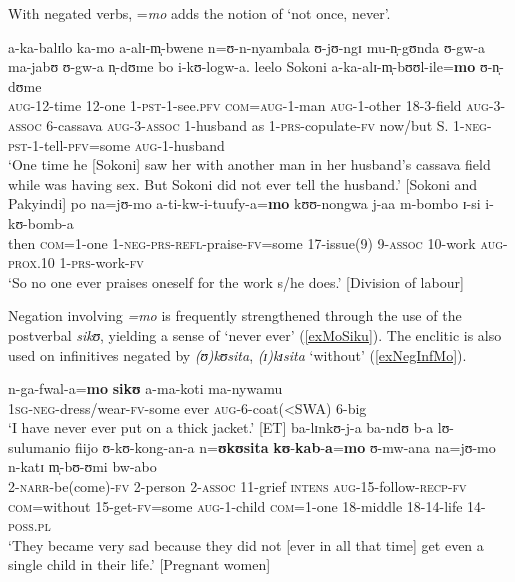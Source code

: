 With negated verbs, =\textit{mo} adds the notion of `not once, never'.
\begin{exe}
	\ex \gll a-ka-balɪlo ka-mo a-alɪ-m̩-bwene n=ʊ-n-nyambala ʊ-jʊ-ngɪ mu-n̩-gʊnda ʊ-gw-a ma-jabʊ ʊ-gw-a n̩-dʊme bo i-kʊ-logw-a. leelo Sokoni a-ka-alɪ-m̩-bʊʊl-ile=\textbf{mo} ʊ-n̩-dʊme\\
	\textsc{aug}-12-time 12-one 1-\textsc{pst}-1-see.\textsc{pfv} \textsc{com}=\textsc{aug}-1-man \textsc{aug}-1-other 18-3-field \textsc{aug}-3-\textsc{assoc} 6-cassava \textsc{aug}-3-\textsc{assoc} 1-husband as 1-\textsc{prs}-copulate-\textsc{fv} now/but S. 1-\textsc{neg}-\textsc{pst}-1-tell-\textsc{pfv}=some \textsc{aug}-1-husband\\
	\glt `‎‎One time he [Sokoni] saw her with another man in her husband's cassava field while was having sex. But Sokoni did not ever tell the husband.' [Sokoni and Pakyindi]
	\ex \gll po na=jʊ-mo a-ti-kw-i-tuufy-a=\textbf{mo} kʊʊ-nongwa j-aa m-bombo ɪ-si i-kʊ-bomb-a\\
	then \textsc{com}=1-one 1-\textsc{neg}-\textsc{prs}-\textsc{refl}-praise-\textsc{fv}=some 17-issue(9) 9-\textsc{assoc} 10-work \textsc{aug}-\textsc{prox.10} 1-\textsc{prs}-work-\textsc{fv}\\
	\glt \lq So no one ever praises oneself for the work s/he does.' [Division of labour]
\end{exe}

Negation involving \textit{=mo} is frequently strengthened through the use of the postverbal \textit{sikʊ}, yielding a sense of `never ever' (\ref{exMoSiku}). The enclitic is also used on infinitives negated by \textit{(ʊ)kʊsita}, \textit{(ɪ)kɪsita} `without' (\ref{exNegInfMo}).
\begin{exe}
	\ex\label{exMoSiku}
	\gll n-ga-fwal-a=\textbf{mo} \textbf{sikʊ} a-ma-koti ma-nywamu\\
	\textsc{1sg}-\textsc{neg}-dress/wear-\textsc{fv}-some ever \textsc{aug}-6-coat(<SWA) 6-big\\
	\glt \lq I have never ever put on a thick jacket.' [ET]
	\ex \label{exNegInfMo}
	\gll ba-lɪnkʊ-j-a ba-ndʊ b-a lʊ-sulumanio fiijo ʊ-kʊ-kong-an-a n=\textbf{ʊkʊsita} \textbf{kʊ}-\textbf{kab}-\textbf{a}=\textbf{mo} ʊ-mw-ana na=jʊ-mo n-katɪ m̩-bʊ-ʊmi bw-abo\\
	2-\textsc{narr}-be(come)-\textsc{fv} 2-person 2-\textsc{assoc} 11-grief \textsc{intens} \textsc{aug}-15-follow-\textsc{recp}-\textsc{fv} \textsc{com}=without 15-get-\textsc{fv}=some \textsc{aug}-1-child \textsc{com}=1-one 18-middle 18-14-life 14-\textsc{poss.pl}\\
	\glt `They became very sad because they did not [ever in all that time] get even a single child in their life.' [Pregnant women]
\end{exe}

